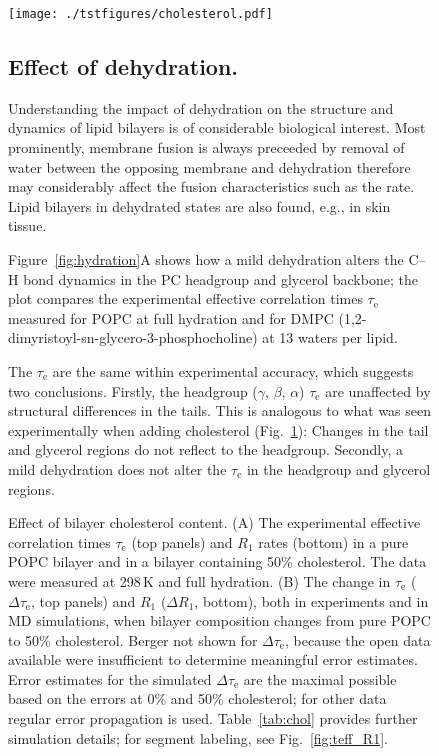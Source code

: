\documentclass[journal=jcisd8,manuscript=article,layout=twocolumn]{achemso}
\begin{document}
\begin{figure}[h!]
	\centering
	\texttt{[image: ./tstfigures/cholesterol.pdf]}  
	\caption{Effect of bilayer cholesterol content.
	(A) The experimental effective correlation times $\tau_\mathrm{e}$ (top panels) and $R_{1}$ rates (bottom) in a pure POPC bilayer and in a bilayer containing 50\% cholesterol. The data were measured at 298\,K and full hydration.
	(B) The change in $\tau_\mathrm{e}$ ($\Delta\tau_\mathrm{e}$, top panels) and $R_{1}$ ($\Delta R_{1}$, bottom),
	both in experiments and in MD simulations, when bilayer composition changes from pure POPC to 50\% cholesterol.
	Berger not shown for $\Delta\tau_\mathrm{e}$, because the open data available were insufficient to determine meaningful error estimates.
	Error estimates for the simulated $\Delta\tau_\mathrm e$ are the maximal possible
	based on the errors at 0\% and 50\% cholesterol;
	for other data regular error propagation is used.
	Table~\ref{tab:chol} provides further simulation details;
	for segment labeling, see Fig.~\ref{fig:teff_R1}.
	}
	\label{fig:chol}
	
\subsection*{Effect of dehydration.}
Understanding the impact of dehydration on the structure and dynamics of lipid bilayers is of considerable biological interest. Most prominently, membrane fusion is always preceeded by removal of water between the opposing membrane and dehydration therefore may considerably affect the fusion characteristics such as the rate. Lipid bilayers in dehydrated states are also found, e.g., in skin tissue. 

Figure~\ref{fig:hydration}A shows how a mild dehydration alters the
C--H bond dynamics in the PC headgroup and glycerol backbone;
the plot compares the experimental effective correlation times $\tau_\mathrm e$
measured for POPC at full hydration and for DMPC (1,2-dimyristoyl-sn-glycero-3-phosphocholine)
at 13 waters per lipid.


The $\tau_\mathrm e$ are the same within experimental accuracy, which suggests two conclusions. Firstly, 
the headgroup ($\gamma$, $\beta$, $\alpha$) $\tau_\mathrm e$ are unaffected by structural differences in the tails. This is analogous to  what was seen experimentally when adding cholesterol
(Fig.~\ref{fig:chol}): Changes in the tail and glycerol regions do not reflect to the headgroup. Secondly, a mild dehydration does not alter the $\tau_\mathrm e$
in the headgroup and glycerol regions. 


\end{figure}
\end{document}
